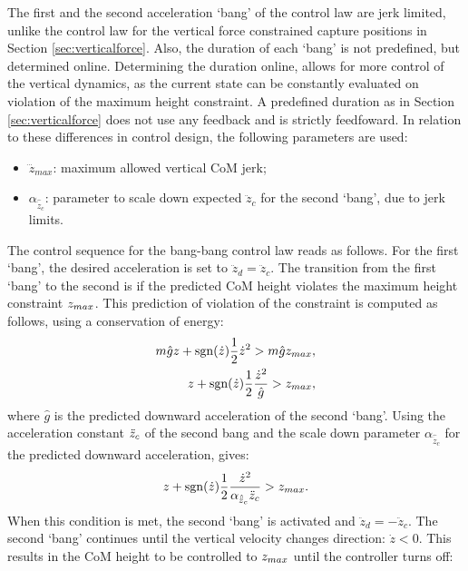 The first and the second acceleration `bang' of the control law are jerk limited, unlike the control law for the vertical force constrained capture positions in Section \ref{sec:verticalforce}. Also, the duration of each `bang' is not predefined, but determined online. Determining the duration online, allows for more control of the vertical dynamics, as the current state can be constantly evaluated on violation of the maximum height constraint. A predefined duration as in Section \ref{sec:verticalforce} does not use any feedback and is strictly feedfoward. In relation to these differences in control design, the following parameters are used:
\begin{itemize}
	\item $\dddot{z}_{max}$: maximum allowed vertical CoM jerk;
	\item $\alpha_{\hat{\ddot{z}}_{c}}$: parameter to scale down expected $\ddot{z}_c$ for the second `bang', due to jerk limits.
\end{itemize}
The control sequence for the bang-bang control law reads as follows. For the first `bang', the desired acceleration is set to $\ddot{z}_d=\ddot{z}_c$. The transition from the first `bang' to the second is if the predicted \ac{CoM} height violates the maximum height constraint $z_{max}$. This prediction of violation of the constraint is computed as follows, using a conservation of energy:
\begin{align}
	m\hat{g}z + \operatorname{sgn}(\dot{z})\frac{1}{2}\dot{z}^2>m\hat{g}z_{max},\\
	z + \operatorname{sgn}(\dot{z})\frac{1}{2}\frac{\dot{z}^2}{\hat{g}}>z_{max},
\end{align}
where $\hat{g}$ is the predicted downward acceleration of the second `bang'. Using the acceleration constant $\ddot{z}_{c}$ of the second bang and the scale down parameter $\alpha_{\hat{\ddot{z}}_{c}}$ for the predicted downward acceleration, gives:
\begin{equation}
	z+\operatorname{sgn}(\dot{z})\frac{1}{2}\frac{\dot{z}^2}{\alpha_{\hat{\ddot{z}}_{c}}\ddot{z}_{c}} >z_{max}.
\end{equation}
When this condition is met, the second `bang' is activated and $\ddot{z}_d=-\ddot{z}_c$. The second `bang' continues until the vertical velocity changes direction: $\dot{z}<0$. This results in the \ac{CoM} height to be controlled to $z_{max}$ until the controller turns off:
